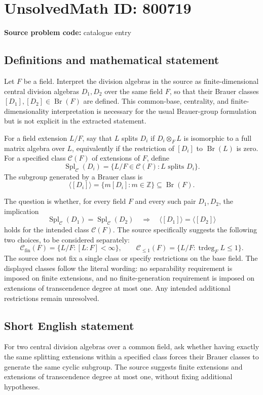 \documentclass[11pt]{article}
\newcommand{\Z}{\mathbb{Z}}
\begin{document}
\section*{UnsolvedMath ID: 800719}
\textbf{Source problem code:} catalogue entry
\subsection{Definitions and mathematical statement}
Let \(F\) be a field. Interpret the division algebras in the source as finite-dimensional central division algebras \(D_1,D_2\) over the same field \(F\), so that their Brauer classes \([D_1],[D_2]\in\operatorname{Br}(F)\) are defined. This common-base, centrality, and finite-dimensionality interpretation is necessary for the usual Brauer-group formulation but is not explicit in the extracted statement.

For a field extension \(L/F\), say that \(L\) splits \(D_i\) if \(D_i\otimes_F L\) is isomorphic to a full matrix algebra over \(L\), equivalently if the restriction of \([D_i]\) to \(\operatorname{Br}(L)\) is zero. For a specified class \(\mathcal C(F)\) of extensions of \(F\), define
\[
\operatorname{Spl}_{\mathcal C}(D_i)=\{L/F\in\mathcal C(F):L\text{ splits }D_i\}.
\]
The subgroup generated by a Brauer class is
\[
\langle[D_i]\rangle=\{m[D_i]:m\in\Z\}\subseteq\operatorname{Br}(F).
\]

The question is whether, for every field \(F\) and every such pair \(D_1,D_2\), the implication
\[
\operatorname{Spl}_{\mathcal C}(D_1)=\operatorname{Spl}_{\mathcal C}(D_2)
\quad\Longrightarrow\quad
\langle[D_1]\rangle=\langle[D_2]\rangle
\]
holds for the intended class \(\mathcal C(F)\). The source specifically suggests the following two choices, to be considered separately:
\[
\mathcal C_{\mathrm{fin}}(F)=\{L/F:[L:F]<\infty\},
\qquad
\mathcal C_{\leq 1}(F)=\{L/F:\operatorname{trdeg}_F L\leq 1\}.
\]
The source does not fix a single class or specify restrictions on the base field. The displayed classes follow the literal wording: no separability requirement is imposed on finite extensions, and no finite-generation requirement is imposed on extensions of transcendence degree at most one. Any intended additional restrictions remain unresolved.
\subsection{Short English statement}
For two central division algebras over a common field, ask whether having exactly the same splitting extensions within a specified class forces their Brauer classes to generate the same cyclic subgroup. The source suggests finite extensions and extensions of transcendence degree at most one, without fixing additional hypotheses.
\end{document}
